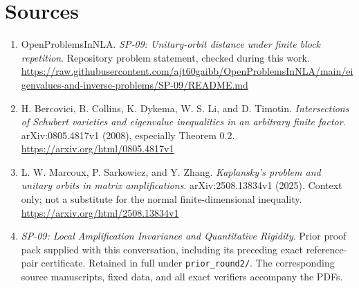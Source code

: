 \documentclass[11pt]{article}
\theoremstyle{remark}\newtheorem{remark}[theorem]{Remark}
\begin{document}
\section*{Sources}
\begin{enumerate}
\item OpenProblemsInNLA. \emph{SP-09: Unitary-orbit distance under finite block repetition}. Repository problem statement, checked during this work.\\
\url{https://raw.githubusercontent.com/ajt60gaibb/OpenProblemsInNLA/main/eigenvalues-and-inverse-problems/SP-09/README.md}
\item H. Bercovici, B. Collins, K. Dykema, W. S. Li, and D. Timotin. \emph{Intersections of Schubert varieties and eigenvalue inequalities in an arbitrary finite factor}. arXiv:0805.4817v1 (2008), especially Theorem 0.2.\\
\url{https://arxiv.org/html/0805.4817v1}
\item L. W. Marcoux, P. Sarkowicz, and Y. Zhang. \emph{Kaplansky's problem and unitary orbits in matrix amplifications}. arXiv:2508.13834v1 (2025). Context only; not a substitute for the normal finite-dimensional inequality.\\
\url{https://arxiv.org/html/2508.13834v1}
\item \emph{SP-09: Local Amplification Invariance and Quantitative Rigidity}. Prior proof pack supplied with this conversation, including its preceding exact reference-pair certificate. Retained in full under \texttt{prior\_round2/}. The corresponding source manuscripts, fixed data, and all exact verifiers accompany the PDFs.
\end{enumerate}
\end{document}

